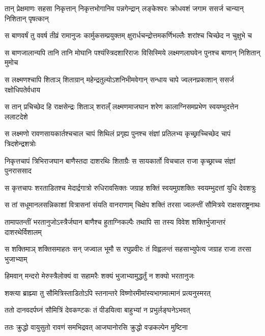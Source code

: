 \twolineshloka
{तान् प्रेक्षमाणः सहसा निकृत्तान् निकृत्तभोगानिव पन्नगेन्द्रान्}
{लङ्केश्वरः क्रोधवशं जगाम ससर्ज चान्यान् निशितान् पृषत्कान्} %

\twolineshloka
{स बाणवर्षं तु ववर्ष तीव्रं रामानुजः कार्मुकसम्प्रयुक्तम्}
{क्षुरार्धचन्द्रोत्तमकर्णिभल्लैः शरांश्च चिच्छेद न चुक्षुभे च} %

\twolineshloka
{स बाणजालान्यपि तानि तानि मोघानि पश्यंस्त्रिदशारिराजः}
{विसिस्मिये लक्ष्मणलाघवेन पुनश्च बाणान् निशितान् मुमोच} %

\twolineshloka
{स लक्ष्मणश्चापि शिताञ् शिताग्रान् महेन्द्रतुल्योऽशनिभीमवेगान्}
{सन्धाय चापे ज्वलनप्रकाशान् ससर्ज रक्षोधिपतेर्वधाय} %

\twolineshloka
{स तान् प्रचिच्छेद हि राक्षसेन्द्रः शिताञ् शराल्ँ लक्ष्मणमाजघान}
{शरेण कालाग्निसमप्रभेण स्वयम्भुदत्तेन ललाटदेशे} %

\twolineshloka
{स लक्ष्मणो रावणसायकार्तश्चचाल चापं शिथिलं प्रगृह्य}
{पुनश्च संज्ञां प्रतिलभ्य कृच्छ्राच्चिच्छेद चापं त्रिदशेन्द्रशत्रोः} %

\twolineshloka
{निकृत्तचापं त्रिभिराजघान बाणैस्तदा दाशरथिः शिताग्रैः}
{स सायकार्तो विचचाल राजा कृच्छ्राच्च संज्ञां पुनराससाद} %

\twolineshloka
{स कृत्तचापः शरताडितश्च मेदार्द्रगात्रो रुधिरावसिक्तः}
{जग्राह शक्तिं स्वयमुग्रशक्तिः स्वयम्भुदत्तां युधि देवशत्रुः} %

\twolineshloka
{स तां सधूमानलसन्निकाशां वित्रासनां संयति वानराणाम्}
{चिक्षेप शक्तिं तरसा ज्वलन्तीं सौमित्रये राक्षसराष्ट्रनाथः} %

\twolineshloka
{तामापतन्तीं भरतानुजोऽस्त्रैर्जघान बाणैश्च हुताग्निकल्पैः}
{तथापि सा तस्य विवेश शक्तिर्भुजान्तरं दाशरथेर्विशालम्} %

\twolineshloka
{स शक्तिमाञ् शक्तिसमाहतः सन् जज्वाल भूमौ स रघुप्रवीरः}
{तं विह्वलन्तं सहसाभ्युपेत्य जग्राह राजा तरसा भुजाभ्याम्} %

\twolineshloka
{हिमवान् मन्दरो मेरुस्त्रैलोक्यं वा सहामरैः}
{शक्यं भुजाभ्यामुद्धर्तुं न शक्यो भरतानुजः} %

\twolineshloka
{शक्त्या ब्राह्म्या तु सौमित्रिस्ताडितोऽपि स्तनान्तरे}
{विष्णोरमीमांस्यभागमात्मानं प्रत्यनुस्मरत्} %

\twolineshloka
{ततो दानवदर्पघ्नं सौमित्रिं देवकण्टकः}
{तं पीडयित्वा बाहुभ्यां न प्रभुर्लङ्घनेऽभवत्} %

\twolineshloka
{ततः क्रुद्धो वायुसुतो रावणं समभिद्रवत्}
{आजघानोरसि क्रुद्धो वज्रकल्पेन मुष्टिना} %


